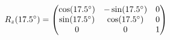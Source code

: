 \documentclass[preview]{standalone}
\begin{document}
\begin{align*}
\special{dvisvgm:raw <g id='unique000'>}R_z(17.5^\circ) = \begin{pmatrix} \cos(17.5^\circ) & -\sin(17.5^\circ) & 0 \\ \sin(17.5^\circ) & \cos(17.5^\circ) & 0 \\ 0 & 0 & 1 \end{pmatrix}\special{dvisvgm:raw </g>}
\end{align*}
\end{document}
